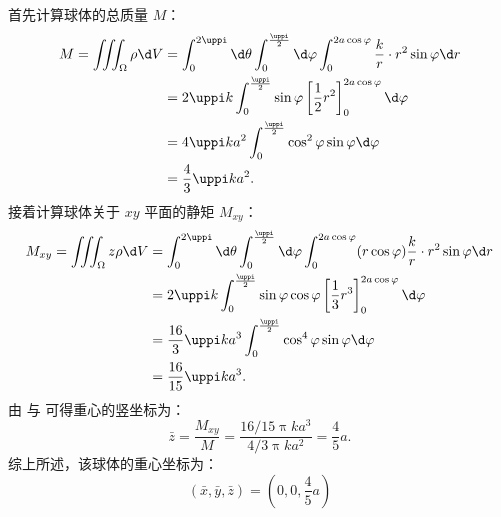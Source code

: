 \begin{solution}
    首先计算球体的总质量 $M$：
    \begin{equation}
        \label{eq:Total-Mass-1}
        \begin{aligned}
            M = \iiint_{\Omega} \rho \d V & = \int_0^{2\uppi} \d \theta \int_0^{\frac{\uppi}{2}} \d \varphi \int_0^{2a \cos \varphi} \frac{k}{r} \cdot r^2 \sin \varphi \d r \\
                                          & = 2\uppi k \int_0^{\frac{\uppi}{2}} \sin \varphi \left[ \frac{1}{2} r^2 \right]_0^{2a \cos \varphi} \d \varphi                   \\
                                          & = 4\uppi k a^2 \int_0^{\frac{\uppi}{2}} \cos^2 \varphi \sin \varphi \d \varphi                                                   \\
                                          & = \frac{4}{3} \uppi k a^2.
        \end{aligned}
    \end{equation}
    接着计算球体关于 $xy$ 平面的静矩 $M_{xy}$：
    \begin{equation}
        \label{eq:Moment-Z-1}
        \begin{aligned}
            M_{xy} = \iiint_{\Omega} z \rho \d V & = \int_0^{2\uppi} \d \theta \int_0^{\frac{\uppi}{2}} \d \varphi \int_0^{2a \cos \varphi} (r \cos \varphi) \frac{k}{r} \cdot r^2 \sin \varphi \d r \\
                                                 & = 2\uppi k \int_0^{\frac{\uppi}{2}} \sin \varphi \cos \varphi \left[ \frac{1}{3} r^3 \right]_0^{2a \cos \varphi} \d \varphi                       \\
                                                 & = \frac{16}{3} \uppi k a^3 \int_0^{\frac{\uppi}{2}} \cos^4 \varphi \sin \varphi \d \varphi                                                        \\
                                                 & = \frac{16}{15} \uppi k a^3.
        \end{aligned}
    \end{equation}
    由  与  可得重心的竖坐标为：
    \begin{equation}
        \bar{z} = \frac{M_{xy}}{M} = \frac{16/15 \uppi k a^3}{4/3 \uppi k a^2} = \frac{4}{5} a.
    \end{equation}
    综上所述，该球体的重心坐标为：
    \begin{equation}
        \boxed{(\bar{x}, \bar{y}, \bar{z}) = \left( 0, 0, \frac{4}{5} a \right)}
    \end{equation}
\end{solution}

